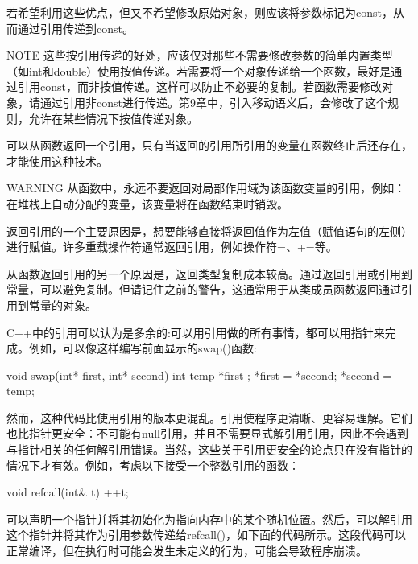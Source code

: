 若希望利用这些优点，但又不希望修改原始对象，则应该将参数标记为const，从而通过引用传递到const。

\begin{myNotic}{NOTE}
这些按引用传递的好处，应该仅对那些不需要修改参数的简单内置类型（如int和double）使用按值传递。若需要将一个对象传递给一个函数，最好是通过引用const，而非按值传递。这样可以防止不必要的复制。若函数需要修改对象，请通过引用非const进行传递。第9章中，引入移动语义后，会修改了这个规则，允许在某些情况下按值传递对象。
\end{myNotic}


可以从函数返回一个引用，只有当返回的引用所引用的变量在函数终止后还存在，才能使用这种技术。

\begin{myWarning}{WARNING}
从函数中，永远不要返回对局部作用域为该函数变量的引用，例如：在堆栈上自动分配的变量，该变量将在函数结束时销毁。
\end{myWarning}

返回引用的一个主要原因是，想要能够直接将返回值作为左值（赋值语句的左侧）进行赋值。许多重载操作符通常返回引用，例如操作符=、+=等。

从函数返回引用的另一个原因是，返回类型复制成本较高。通过返回引用或引用到常量，可以避免复制。但请记住之前的警告，这通常用于从类成员函数返回通过引用到常量的对象。


C++中的引用可以认为是多余的:可以用引用做的所有事情，都可以用指针来完成。例如，可以像这样编写前面显示的swap()函数:

\begin{cpp}
void swap(int* first, int* second)
{
    int temp { *first };
    *first = *second;
    *second = temp;
}
\end{cpp}

然而，这种代码比使用引用的版本更混乱。引用使程序更清晰、更容易理解。它们也比指针更安全：不可能有null引用，并且不需要显式解引用引用，因此不会遇到与指针相关的任何解引用错误。当然，这些关于引用更安全的论点只在没有指针的情况下才有效。例如，考虑以下接受一个整数引用的函数：

\begin{cpp}
void refcall(int& t) { ++t; }
\end{cpp}

可以声明一个指针并将其初始化为指向内存中的某个随机位置。然后，可以解引用这个指针并将其作为引用参数传递给refcall()，如下面的代码所示。这段代码可以正常编译，但在执行时可能会发生未定义的行为，可能会导致程序崩溃。


